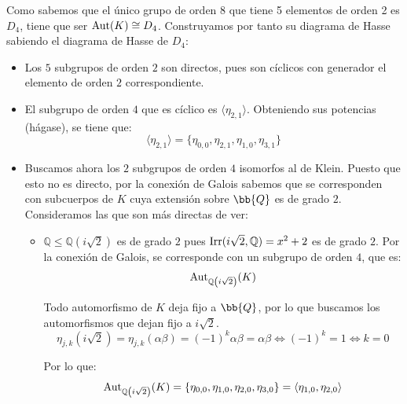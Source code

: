 \begin{ejemplo}
    Como sabemos que el único grupo de orden $8$ que tiene 5 elementos de orden 2 es $D_4$, tiene que ser $\operatorname{Aut}(K) \cong D_4$. Construyamos por tanto su diagrama de Hasse sabiendo el diagrama de Hasse de $D_4$:
    \begin{itemize}
        \item Los $5$ subgrupos de orden $2$ son directos, pues son cíclicos con generador el elemento de orden $2$ correspondiente.
        \item El subgrupo de orden $4$ que es cíclico es $\langle \eta_{2,1} \rangle$. Obteniendo sus potencias (hágase), se tiene que:
        \begin{equation*}
            \langle \eta_{2,1} \rangle = \{\eta_{0,0},\eta_{2,1},\eta_{1,0},\eta_{3,1}\}
        \end{equation*}

        \item Buscamos ahora los $2$ subgrupos de orden $4$ isomorfos al de Klein. Puesto que esto no es directo, por la conexión de Galois sabemos que se corresponden con subcuerpos de $K$ cuya extensión sobre $\bb{Q}$ es de grado $2$. Consideramos las que son más directas de ver:
        \begin{itemize}
            \item $\mathbb{Q}\leq \mathbb{Q}\left(i\sqrt{2}\right)$ es de grado $2$ pues $\operatorname{Irr}(i\sqrt{2},\mathbb{Q}) = x^2+2$ es de grado $2$. Por la conexión de Galois, se corresponde con un subgrupo de orden $4$, que es:
            \begin{equation*}
                \operatorname{Aut}_{\mathbb{Q}\left(i\sqrt{2}\right)}(K)
            \end{equation*}

            Todo automorfismo de $K$ deja fijo a $\bb{Q}$, por lo que buscamos los automorfismos que dejan fijo a $i\sqrt{2}$.
            \begin{equation*}
                \eta_{j,k}(i\sqrt{2}) = \eta_{j,k}(\alpha\beta) = (-1)^k\alpha\beta = \alpha\beta \iff (-1)^k = 1 \iff k=0
            \end{equation*}

            Por lo que:
            \begin{equation*}
                \operatorname{Aut}_{\mathbb{Q}\left(i\sqrt{2}\right)}(K) = \{\eta_{0,0},\eta_{1,0},\eta_{2,0},\eta_{3,0}\} = \langle \eta_{1,0},\eta_{2,0}\rangle
            \end{equation*}


\end{itemize}
\end{itemize}
\end{ejemplo}
